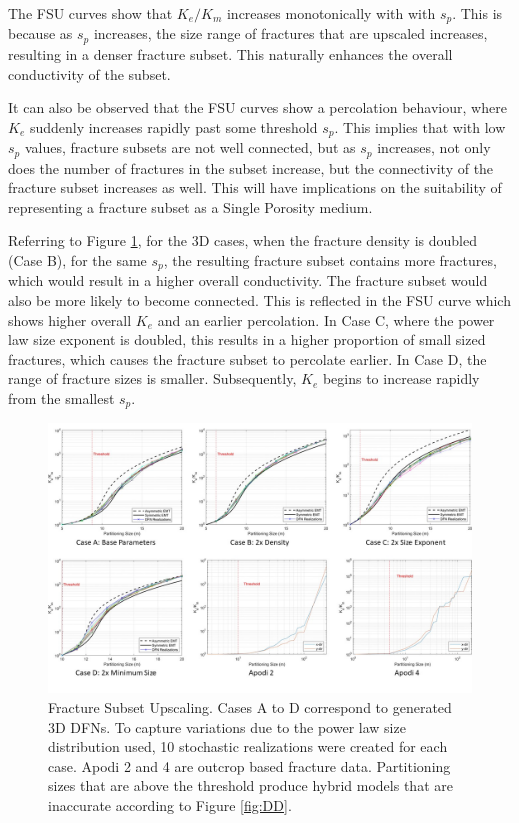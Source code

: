 \documentclass[draft]{agujournal2018}
\begin{document}
The FSU curves show that $K_e/K_m$ increases monotonically with with $s_p$. This is because as $s_p$ increases, the size range of fractures that are upscaled increases, resulting in a denser fracture subset. This naturally enhances the overall conductivity of the subset.

It can also be observed that the FSU curves show a percolation behaviour, where $K_e$ suddenly increases rapidly past some threshold $s_p$. This implies that with low $s_p$ values, fracture subsets are not well connected, but as $s_p$ increases, not only does the number of fractures in the subset increase, but the connectivity of the fracture subset increases as well. This will have implications on the suitability of representing a fracture subset as a Single Porosity medium.

Referring to Figure \ref{fig:FSU}, for the 3D cases, when the fracture density is doubled (Case B), for the same $s_p$, the resulting fracture subset contains more fractures, which would result in a higher overall conductivity. The fracture subset would also be more likely to become connected. This is reflected in the FSU curve which shows higher overall $K_e$ and an earlier percolation. In Case C, where the power law size exponent is doubled, this results in a higher proportion of small sized fractures, which causes the fracture subset to percolate earlier. In Case D, the range of fracture sizes is smaller. Subsequently, $K_e$ begins to increase rapidly from the smallest $s_p$.

\begin{figure}[h]
 \centering

 \includegraphics[width=\textwidth]{FSU/FSU_main.jpg}

 \caption{Fracture Subset Upscaling. Cases A to D correspond to generated 3D DFNs. To capture variations due to the power law size distribution used, 10 stochastic realizations were created for each case. Apodi 2 and 4 are outcrop based fracture data. Partitioning sizes that are above the threshold produce hybrid models that are inaccurate according to Figure \ref{fig:DD}.}
 \label{fig:FSU}
\end{figure}
\end{document}
